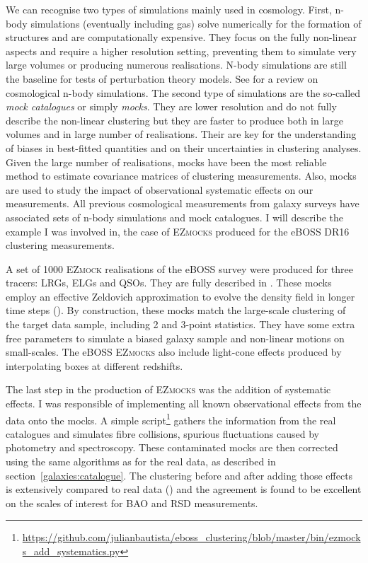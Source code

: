 We can recognise two types of simulations mainly used in cosmology. First, 
n-body simulations (eventually including gas) solve numerically for the formation of structures
and are computationally expensive. They focus on the fully non-linear aspects and require a 
higher resolution setting, preventing them to simulate very large volumes or producing numerous 
realisations. N-body simulations are still the baseline for tests of perturbation theory models.
See \cite{anguloLargescaleDarkMatter2022} for a review on cosmological n-body simulations.  
The second type of simulations are the so-called \emph{mock catalogues} or simply \emph{mocks}. 
They are lower resolution and do not fully describe the non-linear clustering but they are 
faster to produce both in large volumes and in large number of realisations.
Their are key for the understanding of biases in best-fitted quantities and on their uncertainties 
in clustering analyses. 
Given the large number of realisations, mocks have been the most reliable method to estimate 
covariance matrices of clustering measurements. 
Also, mocks are used to study the impact of observational systematic effects on our 
measurements. 
All previous cosmological measurements from galaxy surveys have associated sets of 
n-body simulations and mock catalogues. I will describe the example I was involved in, 
the case of \textsc{EZmocks} produced for the eBOSS DR16 clustering measurements. 

A set of 1000 \textsc{EZmock} realisations of the eBOSS survey were produced for three tracers:
LRGs, ELGs and QSOs. 
They are fully described in \cite{zhaoCompletedSDSSIVExtended2021}. 
These mocks employ an effective Zeldovich approximation to evolve 
the density field in longer time steps (\cite{chuangEZmocksExtendingZel2015}). 
By construction, these mocks match the large-scale clustering 
of the target data sample, including 2 and 3-point statistics. 
They have some extra free parameters to simulate a biased galaxy sample and non-linear motions on small-scales.  
The eBOSS \textsc{EZmocks} also include light-cone effects produced by interpolating boxes
at different redshifts. 

The last step in the production of \textsc{EZmocks} was the addition of systematic effects. 
I was responsible of implementing all known observational effects from the data onto the mocks. 
A simple script\footnote{\url{https://github.com/julianbautista/eboss_clustering/blob/master/bin/ezmocks_add_systematics.py}}
gathers the information from the real catalogues and simulates fibre collisions, spurious 
fluctuations caused by photometry and spectroscopy. 
These contaminated mocks are then corrected using the same algorithms as for the real data, 
as described in section~\ref{galaxies:catalogue}. The clustering before and after adding 
those effects is extensively compared to real data (\cite{zhaoCompletedSDSSIVExtended2021}) 
and the agreement is found to be excellent on the scales of interest for BAO and RSD measurements. 



